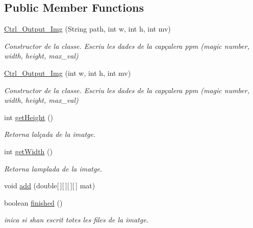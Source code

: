 \subsection*{Public Member Functions}
\begin{DoxyCompactItemize}
\item 
\hyperlink{classpersistencia_1_1output_1_1Ctrl__Output__Img_aa3f2948dd4645d8b121eedf30daa0c3f}{Ctrl\+\_\+\+Output\+\_\+\+Img} (String path, int w, int h, int mv)
\begin{DoxyCompactList}\small\item\em Constructor de la classe. Escriu les dades de la capçalera ppm (magic number, width, height, max\+\_\+val) \end{DoxyCompactList}\item 
\hyperlink{classpersistencia_1_1output_1_1Ctrl__Output__Img_aa0e106a1fc829ebba51e0ba6d9d65a63}{Ctrl\+\_\+\+Output\+\_\+\+Img} (int w, int h, int mv)
\begin{DoxyCompactList}\small\item\em Constructor de la classe. Escriu les dades de la capçalera ppm (magic number, width, height, max\+\_\+val) \end{DoxyCompactList}\item 
int \hyperlink{classpersistencia_1_1output_1_1Ctrl__Output__Img_a736bcf38410d875d9b4a17fd2a95cc4d}{get\+Height} ()
\begin{DoxyCompactList}\small\item\em Retorna l\textquotesingle{}alçada de la imatge. \end{DoxyCompactList}\item 
int \hyperlink{classpersistencia_1_1output_1_1Ctrl__Output__Img_ab6e88e466e6b7d7d847be2ac9c26c529}{get\+Width} ()
\begin{DoxyCompactList}\small\item\em Retorna l\textquotesingle{}amplada de la imatge. \end{DoxyCompactList}\item 
void \hyperlink{classpersistencia_1_1output_1_1Ctrl__Output__Img_a305a977f4d4b999cf65e14e7106b6c5e}{add} (double\mbox{[}$\,$\mbox{]}\mbox{[}$\,$\mbox{]}\mbox{[}$\,$\mbox{]}\mbox{[}$\,$\mbox{]} mat)
\item 
boolean \hyperlink{classpersistencia_1_1output_1_1Ctrl__Output__Img_a365d043ee5bd08c4e470bff468773552}{finished} ()
\begin{DoxyCompactList}\small\item\em inica si s\textquotesingle{}han escrit totes les files de la imatge. \end{DoxyCompactList}\end{DoxyCompactItemize}
